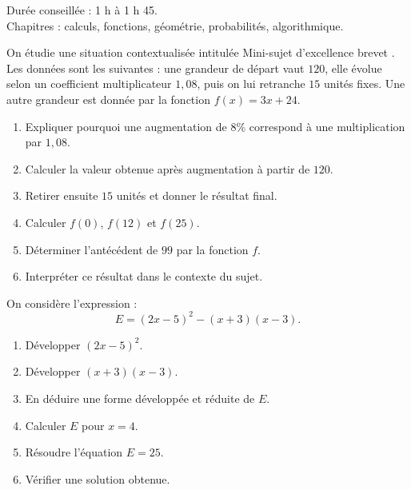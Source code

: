 \documentclass[11pt,a4paper]{article}
\newcounter{exercice}
\begin{document}
\begin{objectif}
Durée conseillée : 1 h à 1 h 45.\\
Chapitres : calculs, fonctions, géométrie, probabilités, algorithmique.
\end{objectif}
\begin{exercice}
On étudie une situation contextualisée intitulée \og Mini-sujet d'excellence brevet \fg. Les données sont les suivantes : une grandeur de départ vaut $120$, elle évolue selon un coefficient multiplicateur $1{,}08$, puis on lui retranche $15$ unités fixes. Une autre grandeur est donnée par la fonction $f(x)=3x+24$.
\begin{enumerate}
  \item Expliquer pourquoi une augmentation de $8\%$ correspond à une multiplication par $1{,}08$.
  \item Calculer la valeur obtenue après augmentation à partir de $120$.
  \item Retirer ensuite $15$ unités et donner le résultat final.
  \item Calculer $f(0)$, $f(12)$ et $f(25)$.
  \item Déterminer l'antécédent de $99$ par la fonction $f$.
  \item Interpréter ce résultat dans le contexte du sujet.
\end{enumerate}
\end{exercice}

\begin{exercice}
On considère l'expression :
\[
E=(2x-5)^2-(x+3)(x-3).
\]
\begin{enumerate}
  \item Développer $(2x-5)^2$.
  \item Développer $(x+3)(x-3)$.
  \item En déduire une forme développée et réduite de $E$.
  \item Calculer $E$ pour $x=4$.
  \item Résoudre l'équation $E=25$.
  \item Vérifier une solution obtenue.
\end{enumerate}
\end{exercice}
\end{document}
